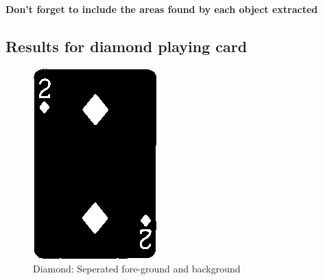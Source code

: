 \documentclass[conference]{IEEEtran}
\begin{document}
\textbf{Don't forget to include the areas found by each object extracted}\subsection{Results for diamond playing card}
\begin{figure}[!htb]
  \centering
  \begin{minipage}[b]{0.2\textwidth}
    \includegraphics[width=\textwidth]{../programme/results/Task_3/diamond/image_0.jpg}
    \caption{Diamond: Seperated fore-ground and background}
    \label{Diamond: Seperated fore-ground and background}
  \end{minipage}
  \hfill
  \begin{minipage}[b]{0.2\textwidth}

\end{minipage}
\end{figure}
\end{document}
